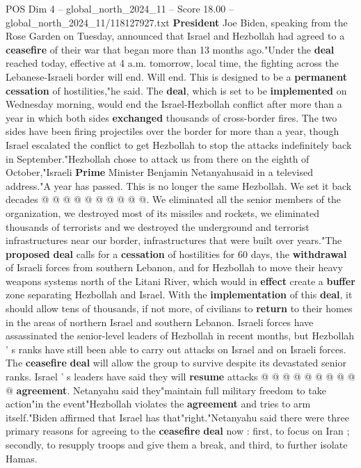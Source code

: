\begin{textsample}{POS Dim 4 – global\_north\_2024\_11 – Score 18.00 – global\_north\_2024\_11/118127927.txt}  \label{ex:f4_pos_287}
\textbf{President} Joe Biden, speaking from the Rose Garden on Tuesday, announced that Israel and Hezbollah had agreed to a \textbf{ceasefire} of their war that began more than 13 months ago."Under the \textbf{deal} reached today, effective at 4 a.m. tomorrow, local time, the fighting across the Lebanese-Israeli border will end.
Will end.
This is designed to be a \textbf{permanent} \textbf{cessation} of hostilities,"he said.
The \textbf{deal}, which is set to be \textbf{implemented} on Wednesday morning, would end the Israel-Hezbollah conflict after more than a year in which both sides \textbf{exchanged} thousands of cross-border fires.
The two sides have been firing projectiles over the border for more than a year, though Israel escalated the conflict to get Hezbollah to stop the attacks indefinitely back in September."Hezbollah chose to attack us from there on the eighth of October,"Israeli \textbf{Prime} Minister Benjamin Netanyahusaid in a televised address."A year has passed.
This is no longer the same Hezbollah.
We set it back decades @ @ @ @ @ @ @ @ @ @.
We eliminated all the senior members of the organization, we destroyed most of its missiles and rockets, we eliminated thousands of terrorists and we destroyed the underground and terrorist infrastructures near our border, infrastructures that were built over years."The \textbf{proposed} \textbf{deal} calls for a \textbf{cessation} of hostilities for 60 days, the \textbf{withdrawal} of Israeli forces from southern Lebanon, and for Hezbollah to move their heavy weapons systems north of the Litani River, which would in \textbf{effect} create a \textbf{buffer} zone separating Hezbollah and Israel.
With the \textbf{implementation} of this \textbf{deal}, it should allow tens of thousands, if not more, of civilians to \textbf{return} to their homes in the areas of northern Israel and southern Lebanon.
Israeli forces have assassinated the senior-level leaders of Hezbollah in recent months, but Hezbollah ' s ranks have still been able to carry out attacks on Israel and on Israeli forces.
The \textbf{ceasefire} \textbf{deal} will allow the group to survive despite its devastated senior ranks.
Israel ' s leaders have said they will \textbf{resume} attacks @ @ @ @ @ @ @ @ @ @ \textbf{agreement}.
Netanyahu said they"maintain full military freedom to take action"in the event"Hezbollah violates the \textbf{agreement} and tries to arm itself."Biden affirmed that Israel has that"right."Netanyahu said there were three primary reasons for agreeing to the \textbf{ceasefire} \textbf{deal} now : first, to focus on Iran ; secondly, to resupply troops and give them a break, and third, to further isolate Hamas.

\end{textsample}
